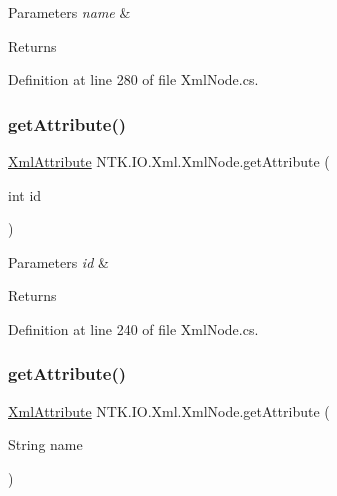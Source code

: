 \begin{DoxyParams}{Parameters}
{\em name} & \\
\hline
\end{DoxyParams}
\begin{DoxyReturn}{Returns}

\end{DoxyReturn}


Definition at line 280 of file Xml\+Node.\+cs.

\mbox{\label{class_n_t_k_1_1_i_o_1_1_xml_1_1_xml_node_a3b8c5adaae1bd784ef89e1f57cb3e34c}} 
\subsubsection{\texorpdfstring{getAttribute()}{getAttribute()}\hspace{0.1cm}{\footnotesize\ttfamily [1/2]}}
{\footnotesize\ttfamily \mbox{\hyperlink{class_n_t_k_1_1_i_o_1_1_xml_1_1_xml_attribute}{Xml\+Attribute}} N\+T\+K.\+I\+O.\+Xml.\+Xml\+Node.\+get\+Attribute (\begin{DoxyParamCaption}\item[{int}]{id }\end{DoxyParamCaption})}






\begin{DoxyParams}{Parameters}
{\em id} & \\
\hline
\end{DoxyParams}
\begin{DoxyReturn}{Returns}

\end{DoxyReturn}


Definition at line 240 of file Xml\+Node.\+cs.

\mbox{\label{class_n_t_k_1_1_i_o_1_1_xml_1_1_xml_node_a13815fd610930b6821028dbce7a19104}} 
\subsubsection{\texorpdfstring{getAttribute()}{getAttribute()}\hspace{0.1cm}{\footnotesize\ttfamily [2/2]}}
{\footnotesize\ttfamily \mbox{\hyperlink{class_n_t_k_1_1_i_o_1_1_xml_1_1_xml_attribute}{Xml\+Attribute}} N\+T\+K.\+I\+O.\+Xml.\+Xml\+Node.\+get\+Attribute (\begin{DoxyParamCaption}\item[{String}]{name }\end{DoxyParamCaption})}






